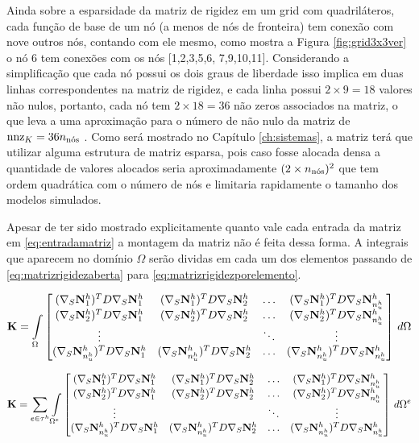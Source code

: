 Ainda sobre a esparsidade da matriz de rigidez em um grid com quadriláteros, cada função de base de um nó (a menos de nós de fronteira) tem conexão com nove outros nós, contando com ele mesmo, como mostra a Figura \ref{fig:grid3x3ver} o nó 6 tem conexões com os nós [1,2,3,5,6, 7,9,10,11]. Considerando a simplificação que cada nó possui os dois graus de liberdade isso implica em duas linhas correspondentes na matriz de rigidez, e cada linha possui $2 \times 9 = 18$ valores não nulos, portanto, cada nó tem $2 \times 18 = 36$ não zeros associados na matriz, o que leva a uma aproximação para o número de não nulo da matriz de $\text{nnz}_K = 36 \qtdnos$ . Como será mostrado no Capítulo \ref{ch:sistemas}, a matriz terá que utilizar alguma estrutura de matriz esparsa, pois caso fosse alocada densa a quantidade de valores alocados seria aproximadamente $(2 \times \qtdnos)^2$ que tem ordem quadrática com o número de nós e limitaria rapidamente o tamanho dos modelos simulados. 


Apesar de ter sido mostrado explicitamente quanto vale cada entrada da matriz em \eqref{eq:entradamatriz} a montagem da matriz não é feita dessa forma. A integrais que aparecem no domínio $\Omega$ serão dividas em cada um dos elementos passando de \eqref{eq:matrizrigidezaberta} para \eqref{eq:matrizrigidezporelemento}. 

\begin{equation}\label{eq:matrizrigidezaberta}
\mathbf{K}  = \omeint{
\begin{bmatrix}
\kij{1}{1} & \kij{1}{2}  & \hdots & \kij{1}{\freedomfine} \\ 
\kij{2}{1} & \kij{2}{2}  & \hdots & \kij{2}{\freedomfine} \\ 
\vdots &  & \ddots & \vdots\\ 
\kij{\freedomfine}{1} & \kij{\freedomfine}{2}  & \hdots & \kij{\freedomfine}{\freedomfine} 
\end{bmatrix}
}
\end{equation}


\begin{equation}\label{eq:matrizrigidezporelemento}
\mathbf{K}  = \sum_{e \in \tau^h} \omeeint{
\begin{bmatrix}
\kij{1}{1} & \kij{1}{2}  & \hdots & \kij{1}{\freedomfine} \\ 
\kij{2}{1} & \kij{2}{2}  & \hdots & \kij{2}{\freedomfine} \\ 
\vdots     &             & \ddots & \vdots\\ 
\kij{\freedomfine}{1} & \kij{\freedomfine}{2}  & \hdots & \kij{\freedomfine}{\freedomfine} 
\end{bmatrix}
}
\end{equation}



